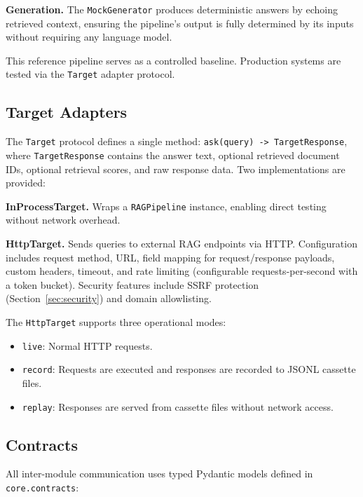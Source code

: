\documentclass[11pt,a4paper]{article}
\begin{document}
\textbf{Generation.} The \texttt{MockGenerator} produces deterministic
answers by echoing retrieved context, ensuring the pipeline's output is
fully determined by its inputs without requiring any language model.

This reference pipeline serves as a controlled baseline. Production systems
are tested via the \texttt{Target} adapter protocol.

\subsection{Target Adapters}

The \texttt{Target} protocol defines a single method:
\texttt{ask(query) -> TargetResponse}, where \texttt{TargetResponse}
contains the answer text, optional retrieved document IDs, optional
retrieval scores, and raw response data. Two implementations are provided:

\textbf{InProcessTarget.} Wraps a \texttt{RAGPipeline} instance, enabling
direct testing without network overhead.

\textbf{HttpTarget.} Sends queries to external RAG endpoints via HTTP.
Configuration includes request method, URL, field mapping for request/response
payloads, custom headers, timeout, and rate limiting (configurable
requests-per-second with a token bucket). Security features include SSRF
protection (Section~\ref{sec:security}) and domain allowlisting.

The \texttt{HttpTarget} supports three operational modes:
\begin{itemize}[nosep]
  \item \texttt{live}: Normal HTTP requests.
  \item \texttt{record}: Requests are executed and responses are recorded
        to JSONL cassette files.
  \item \texttt{replay}: Responses are served from cassette files without
        network access.
\end{itemize}

\subsection{Contracts}

All inter-module communication uses typed Pydantic models defined in
\texttt{core.contracts}:
\end{document}
